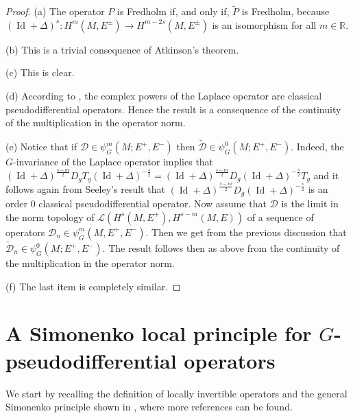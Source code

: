 \documentclass[11pt,a4paper]{amsart}
\newcommand{\R}{\mathbb R}
\newcommand{\maD}{\mathcal D}
\newcommand{\maL}{\mathcal L}
\newcommand\<{\langle}
\renewcommand\>{\rangle}
\newcommand{\oid}{\operatorname{Id}}
\theoremstyle{definition}
\begin{document}
\begin{proof}
(a) The operator $P$ is Fredholm if, and only if, $\tilde{P}$ is Fredholm, because 
 $(\oid +\Delta)^{s} : H^m(M,E^\pm) \rightarrow H^{m-2s}(M,E^\pm)$ is an isomorphism for all $m \in \R$.
 
(b) This is a trivial consequence of Atkinson's theorem. 

(c) This is clear. 

(d)  According to \cite{Seeley.Comp.Power.ellip}, the complex powers of the Laplace operator are classical pseudodifferential operators. Hence the result is a consequence of the
continuity of the multiplication in the operator norm.

(e) Notice that if $\maD \in \psi^m_G(M;E^+,E^-)$ then $\tilde{\maD}\in \psi^0_G(M;E^+,E^-)$.
 Indeed, the $G$-invariance of the Laplace operator implies that 
$(\oid + \Delta)^{\frac{s-m}{2}}D_g T_g (\oid + \Delta)^{-\frac{s}{2}} = 
(\oid + \Delta)^{\frac{s-m}{2}}D_g  (\oid + \Delta)^{-\frac{s}{2}}T_g$ 
and it follows again from Seeley's result \cite{Seeley.Comp.Power.ellip} that 
$(\oid + \Delta)^{\frac{s-m}{2}}D_g  (\oid + \Delta)^{-\frac{s}{2}}$
is an order $0$ classical pseudodifferential operator.
Now assume that $\maD$ is the limit in the norm
topology of $\maL(H^s(M, E^+), H^{s-m}(M, E))$ of a sequence of operators $\maD_n \in \psi^m_G(M, E^+,E^-)$.
Then we get from the previous discussion that $\tilde{\maD}_n \in \psi^0_G(M;E^+,E^-)$.
The result follows then as above from the continuity of the multiplication
in the operator norm.

(f) The last item is completely similar.
\end{proof} 


\section{A Simonenko local principle for $G$-pseudodifferential operators}
\label{sec.Simonenko}

We start by recalling the definition of locally invertible operators and the general Simonenko principle shown in \cite{Baldare.Simonenko}, where more references can be found.
\end{document}
